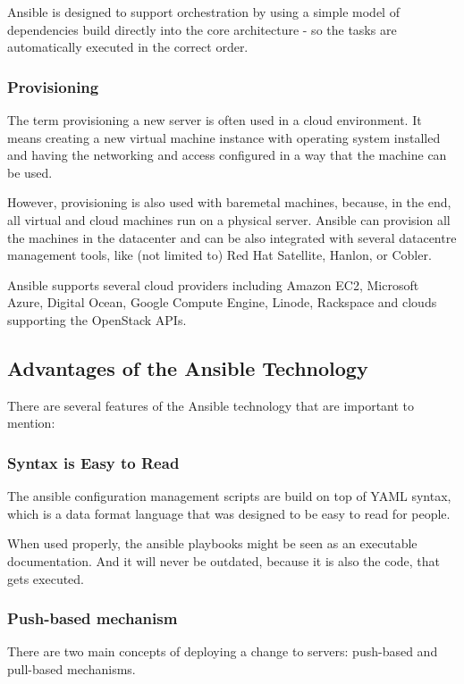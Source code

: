 Ansible is designed to support orchestration by using a simple model of dependencies build directly into the core architecture - so the tasks are automatically executed in the correct order.

\subsubsection*{Provisioning}
The term provisioning a new server is often used in a cloud environment. It means creating a new virtual machine instance with operating system installed and having the networking and access configured in a way that the machine can be used.

However, provisioning is also used with baremetal machines, because, in the end, all virtual and cloud machines run on a physical server. Ansible can provision all the machines in the datacenter and can be also integrated with several datacentre management tools, like (not limited to) Red Hat Satellite, Hanlon, or Cobler.

Ansible supports several cloud providers including Amazon EC2, Microsoft Azure, Digital Ocean, Google Compute Engine, Linode, Rackspace and clouds supporting the OpenStack APIs. \cite{UpAndRunning}

\subsection{Advantages of the Ansible Technology}
There are several features of the Ansible technology that are important to mention:

\subsubsection{Syntax is Easy to Read}
The ansible configuration management scripts are build on top of YAML syntax, which is a data format language that was designed to be easy to read for people.

When used properly, the ansible playbooks might be seen as an executable documentation. And it will never be outdated, because it is also the code, that gets executed.

\subsubsection*{Push-based mechanism}
There are two main concepts of deploying a change to servers: push-based and pull-based mechanisms.

